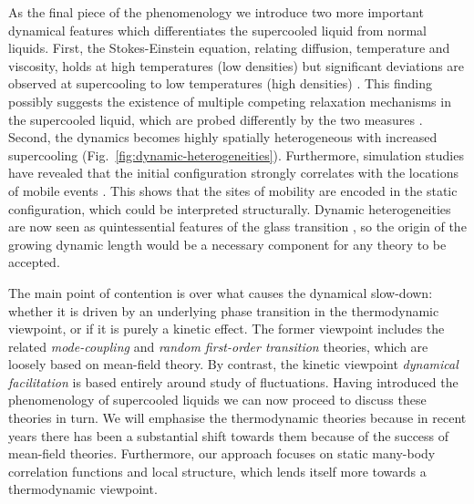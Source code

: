 \documentclass[11pt,twoside]{report}
\begin{document}
As the final piece of the phenomenology we introduce two more important dynamical features which differentiates the supercooled liquid from normal liquids.
First, the Stokes-Einstein equation, relating diffusion, temperature and viscosity, holds at high temperatures (low densities) but significant deviations are observed at supercooling to low temperatures (high densities) \cite{BerthierRMP2011}.
This finding possibly suggests the existence of multiple competing relaxation mechanisms in the supercooled liquid, which are probed differently by the two measures \cite{EdigerARPC2000}.
Second, the dynamics becomes highly spatially heterogeneous with increased supercooling (Fig.\ \ref{fig:dynamic-heterogeneities}).
Furthermore, simulation studies have revealed that the initial configuration strongly correlates with the locations of mobile events \cite{Widmer-CooperJPCM2005}.
This shows that the sites of mobility are encoded in the static configuration, which could be interpreted structurally.
Dynamic heterogeneities are now seen as quintessential features of the glass transition \cite{BerthierRMP2011,BiroliJCP2013}, so the origin of the growing dynamic length would be a necessary component for any theory to be accepted.


The main point of contention is over what causes the dynamical slow-down: whether it is driven by an underlying phase transition in the thermodynamic viewpoint, or if it is purely a kinetic effect.
The former viewpoint includes the related \emph{mode-coupling} and \emph{random first-order transition} theories, which are loosely based on mean-field theory.
By contrast, the kinetic viewpoint \emph{dynamical facilitation} is based entirely around study of fluctuations.
Having introduced the phenomenology of supercooled liquids we can now proceed to discuss these theories in turn.
We will emphasise the thermodynamic theories because in recent years there has been a substantial shift towards them because of the success of mean-field theories.
Furthermore, our approach focuses on static many-body correlation functions and local structure, which lends itself more towards a thermodynamic viewpoint.
\end{document}
